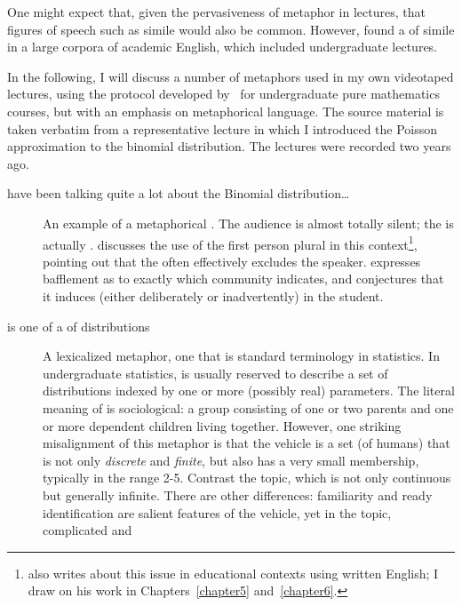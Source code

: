 One might expect that, given the pervasiveness of metaphor in
lectures, that figures of speech such as simile would also be common.
However,  found a 
of simile in a large corpora of academic English, which included
undergraduate lectures.

In the following, I will discuss a number of metaphors used in my own
videotaped lectures, using the protocol developed
by~ for undergraduate pure mathematics courses,
but with an emphasis on metaphorical language.  The source material is
taken verbatim from a representative lecture in which I introduced the
Poisson approximation to the binomial distribution.  The lectures were
recorded two years ago.

\begin{description}
\item[ have been talking quite a lot about the Binomial
  distribution\ldots]{An example of a metaphorical .  The
  audience is almost totally silent; the  is actually
  .   discusses the use of the first
  person plural in this context\footnote{\citeauthor{pimm1984} also
    writes about this issue in educational contexts using written
    English; I draw on his work in Chapters~\ref{chapter5}
    and~\ref{chapter6}.}, pointing out that the  often effectively excludes the speaker.  \citeauthor{pimm1984}
  expresses bafflement as to exactly which community 
  indicates, and conjectures that it induces (either deliberately or
  inadvertently)  in the student.}
\item[ is one of a  of
  distributions]{A lexicalized metaphor, one that is standard
  terminology in statistics.  In undergraduate statistics,
   is usually reserved to describe a set of
  distributions indexed by one or more (possibly real) parameters.
  The literal meaning of  is sociological: a group
  consisting of one or two parents and one or more dependent children
  living together.  However, one striking misalignment of this
  metaphor is that the vehicle is a set (of humans) that is not only
  \emph{discrete} and \emph{finite}, but also has a very small
  membership, typically in the range 2-5.  Contrast the topic, which
  is not only continuous but generally infinite.  There are other
  differences: familiarity and ready identification are salient
  features of the vehicle, yet in the topic, complicated and
}
\end{description}
